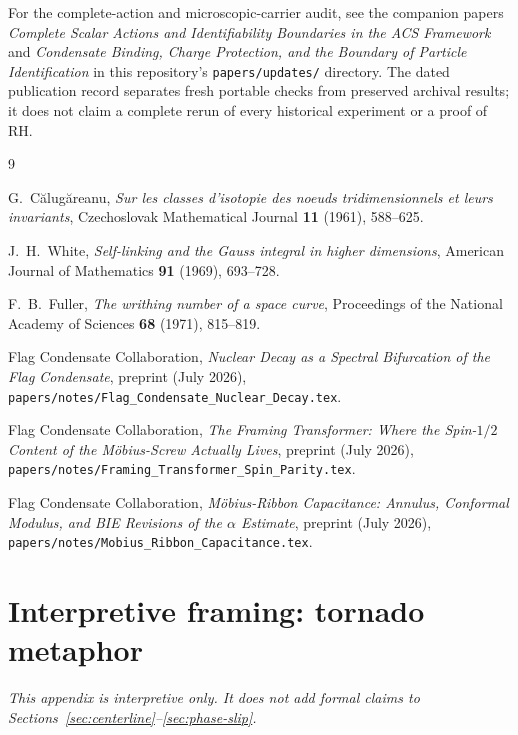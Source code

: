 \documentclass[11pt,a4paper]{article}
\begin{document}
For the complete-action and microscopic-carrier audit, see the companion
papers \emph{Complete Scalar Actions and Identifiability Boundaries in the ACS
Framework} and \emph{Condensate Binding, Charge Protection, and the Boundary
of Particle Identification} in this repository's \texttt{papers/updates/}
directory. The dated publication record separates fresh portable checks
from preserved archival results; it does not claim a complete rerun of every
historical experiment or a proof of RH.

\begin{thebibliography}{9}

G.~C\u{a}lug\u{a}reanu,
\textit{Sur les classes d'isotopie des noeuds tridimensionnels et leurs invariants},
Czechoslovak Mathematical Journal \textbf{11} (1961), 588--625.

J.~H.~White,
\textit{Self-linking and the Gauss integral in higher dimensions},
American Journal of Mathematics \textbf{91} (1969), 693--728.

F.~B.~Fuller,
\textit{The writhing number of a space curve},
Proceedings of the National Academy of Sciences \textbf{68} (1971), 815--819.

Flag Condensate Collaboration,
\textit{Nuclear Decay as a Spectral Bifurcation of the Flag Condensate},
preprint (July 2026),
\nolinkurl{papers/notes/Flag_Condensate_Nuclear_Decay.tex}.

Flag Condensate Collaboration,
\textit{The Framing Transformer: Where the Spin-$1/2$ Content of the
M\"obius-Screw Actually Lives},
preprint (July 2026),
\nolinkurl{papers/notes/Framing_Transformer_Spin_Parity.tex}.

Flag Condensate Collaboration,
\textit{M\"obius-Ribbon Capacitance: Annulus, Conformal Modulus, and BIE
Revisions of the $\alpha$ Estimate},
preprint (July 2026),
\nolinkurl{papers/notes/Mobius_Ribbon_Capacitance.tex}.

\end{thebibliography}

\appendix
\section{Interpretive framing: tornado metaphor}
\label{app:tornado}

\noindent\textit{This appendix is interpretive only.  It does not add
formal claims to Sections~\ref{sec:centerline}--\ref{sec:phase-slip}.}
\end{document}
